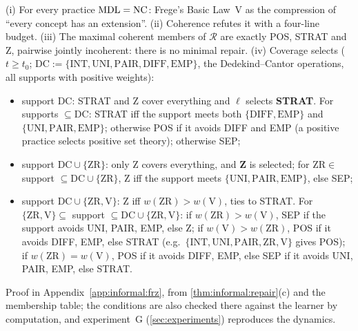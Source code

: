 \begin{theorem}\label{thm:informal:frz}
(i) For every practice $\mathrm{MDL}=\mathrm{NC}$: Frege's Basic Law~V \citep{frege1893grundgesetze} as the compression of ``every concept has an extension''. (ii) Coherence refutes it with a four-line budget. (iii) The maximal coherent members of $\mathcal R$ are exactly POS, STRAT and Z, pairwise jointly incoherent: there is no minimal repair. (iv) Coverage selects ($t\ge t_0$; $\mathrm{DC}:=\{\mathrm{INT},\mathrm{UNI},\mathrm{PAIR},\mathrm{DIFF},\mathrm{EMP}\}$, the Dedekind--Cantor operations, all supports with positive weights):
\begin{itemize}
\item support $\mathrm{DC}$: STRAT and Z cover everything and $\ell$ selects \textbf{STRAT}. For supports $\subseteq\mathrm{DC}$: STRAT iff the support meets both $\{\mathrm{DIFF},\mathrm{EMP}\}$ and $\{\mathrm{UNI},\mathrm{PAIR},\mathrm{EMP}\}$; otherwise POS if it avoids DIFF and EMP (a positive practice selects positive set theory); otherwise SEP;
\item support $\mathrm{DC}\cup\{\mathrm{ZR}\}$: only Z covers everything, and \textbf{Z} is selected; for $\mathrm{ZR}\in$ support $\subseteq\mathrm{DC}\cup\{\mathrm{ZR}\}$, Z iff the support meets $\{\mathrm{UNI},\mathrm{PAIR},\mathrm{EMP}\}$, else SEP;
\item support $\mathrm{DC}\cup\{\mathrm{ZR},\mathrm V\}$: Z iff $w(\mathrm{ZR})>w(\mathrm V)$, ties to STRAT. For $\{\mathrm{ZR},\mathrm V\}\subseteq$ support $\subseteq\mathrm{DC}\cup\{\mathrm{ZR},\mathrm V\}$: if $w(\mathrm{ZR})>w(\mathrm V)$, SEP if the support avoids UNI, PAIR, EMP, else Z; if $w(\mathrm V)>w(\mathrm{ZR})$, POS if it avoids DIFF, EMP, else STRAT (e.g.\ $\{\mathrm{INT},\mathrm{UNI},\mathrm{PAIR},\mathrm{ZR},\mathrm V\}$ gives POS); if $w(\mathrm{ZR})=w(\mathrm V)$, POS if it avoids DIFF, EMP, else SEP if it avoids UNI, PAIR, EMP, else STRAT.
\end{itemize}
\end{theorem}

Proof in Appendix~\ref{app:informal:frz}, from \cref{thm:informal:repair}(c) and the membership table; the conditions are also checked there against the learner by computation, and experiment~G (\cref{sec:experiments}) reproduces the dynamics.

